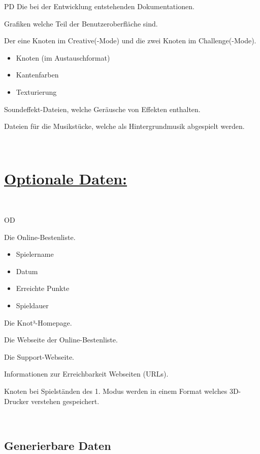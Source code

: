 \begin{ids}{\gls{PD}}
	 \id[80] Die bei der  Entwicklung entstehenden Dokumentationen.
	 
	 \id[90] Grafiken welche Teil der Benutzeroberfläche sind.
	 
	 \id[100] Der eine Knoten im Creative(-Mode) und die zwei Knoten im Challenge(-Mode).
     \begin{itemize}
       \item Knoten (im Austauschformat)
       \item Kantenfarben
       \item Texturierung
     \end{itemize}
  
	 \id[110] Soundeffekt-Dateien, welche Geräusche von Effekten enthalten.
	 
	 \id[120] Dateien für die Musikstücke, welche als Hintergrundmusik abgespielt werden.

\end{ids}
~\\
\section*{\underline{Optionale Daten:}}~\\
\begin{ids}{\gls{OD}}

	\id[10] Die Online-Bestenliste.
	 \begin{itemize}
       \item Spielername
       \item Datum
       \item Erreichte Punkte
       \item Spieldauer
     \end{itemize}
     
     \id[20] Die Knot³-Homepage.
     
     \id[30] Die Webseite der Online-Bestenliste.
     
     \id[40] Die Support-Webseite.
     
     \id[50] Informationen zur Erreichbarkeit Webseiten (URLs).
     
     \id[60] Knoten bei Spielständen des 1. Modus werden in einem Format welches 3D-Drucker verstehen gespeichert.
     
\end{ids}
~\\


\subsection{Generierbare Daten}~\\

